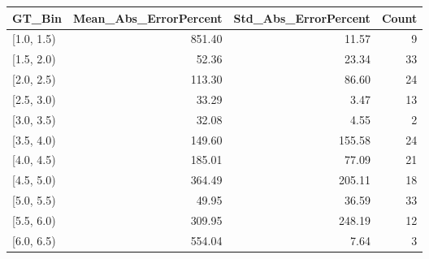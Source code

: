 \begin{tabular}{lrrr}
\toprule
GT_Bin & Mean_Abs_ErrorPercent & Std_Abs_ErrorPercent & Count \\
\midrule
[1.0, 1.5) & 851.40 & 11.57 & 9 \\
[1.5, 2.0) & 52.36 & 23.34 & 33 \\
[2.0, 2.5) & 113.30 & 86.60 & 24 \\
[2.5, 3.0) & 33.29 & 3.47 & 13 \\
[3.0, 3.5) & 32.08 & 4.55 & 2 \\
[3.5, 4.0) & 149.60 & 155.58 & 24 \\
[4.0, 4.5) & 185.01 & 77.09 & 21 \\
[4.5, 5.0) & 364.49 & 205.11 & 18 \\
[5.0, 5.5) & 49.95 & 36.59 & 33 \\
[5.5, 6.0) & 309.95 & 248.19 & 12 \\
[6.0, 6.5) & 554.04 & 7.64 & 3 \\
\bottomrule
\end{tabular}
